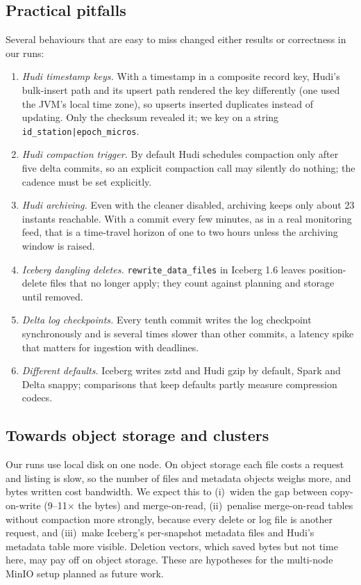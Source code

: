 \documentclass[conference]{IEEEtran}
\begin{document}
\subsection{Practical pitfalls}
Several behaviours that are easy to miss changed either results or correctness in our runs:
\begin{enumerate}
\item \emph{Hudi timestamp keys.} With a timestamp in a composite record key, Hudi's bulk-insert path and its upsert
path rendered the key differently (one used the JVM's local time zone), so upserts inserted duplicates instead of
updating. Only the checksum revealed it; we key on a string \texttt{id\_station|epoch\_micros}.
\item \emph{Hudi compaction trigger.} By default Hudi schedules compaction only after five delta commits, so an
explicit compaction call may silently do nothing; the cadence must be set explicitly.
\item \emph{Hudi archiving.} Even with the cleaner disabled, archiving keeps only about 23 instants reachable. With a
commit every few minutes, as in a real monitoring feed, that is a time-travel horizon of one to two hours unless the
archiving window is raised.
\item \emph{Iceberg dangling deletes.} \texttt{rewrite\_data\_files} in Iceberg 1.6 leaves position-delete files that
no longer apply; they count against planning and storage until removed.
\item \emph{Delta log checkpoints.} Every tenth commit writes the log checkpoint synchronously and is several times
slower than other commits, a latency spike that matters for ingestion with deadlines.
\item \emph{Different defaults.} Iceberg writes zstd and Hudi gzip by default, Spark and Delta snappy; comparisons
that keep defaults partly measure compression codecs.
\end{enumerate}

\subsection{Towards object storage and clusters}
Our runs use local disk on one node. On object storage each file costs a request and listing is slow, so the number
of files and metadata objects weighs more, and bytes written cost bandwidth. We expect this to (i)~widen the gap
between copy-on-write (9--11$\times$ the bytes) and merge-on-read, (ii)~penalise merge-on-read tables without
compaction more strongly, because every delete or log file is another request, and (iii)~make Iceberg's per-snapshot
metadata files and Hudi's metadata table more visible. Deletion vectors, which saved bytes but not time here, may pay
off on object storage. These are hypotheses for the multi-node MinIO setup planned as future work.
\end{document}
